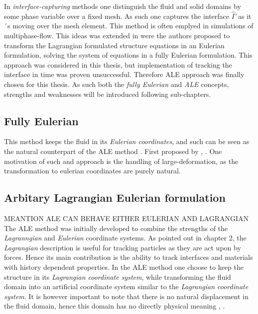 In \textit{interface-capturing} methods one distinguish the fluid and solid domains by some phase variable over a fixed mesh. As such one captures the interface  $\hat{\Gamma}$ as it´s moving over the mesh element. This method is often emplyed in simulations of multiphase-flow. This ideas was extended in \cite{Dunne2006a} were the authors proposed to transform the Lagrangian formulated structure equations in an Eulerian formulation, solving the system of equations in a fully Eulerian formulation. 
This approach was considered in this thesis, but implementation of tracking the interface in time was proven unsuccessful. Therefore ALE approach was finally chosen for this thesis. As such both the \textit{fully Eulerian} and \textit{ALE} concepts, strengths and weaknesses will be introduced following sub-chapters. \\

 
\subsection{Fully Eulerian}
This method keeps the fluid in its \textit{Eulerian coordinates}, and such can be seen as the natural counterpart of the ALE method \cite{Wick2013}. First proposed by , \cite{Dunne2006}. One motivation of such and approach is the handling of large-deformation, as the transformation to eulerian coordinates are purely natural.

\subsection{Arbitary Lagrangian Eulerian formulation}
MEANTION ALE CAN  BEHAVE EITHER EULERIAN AND LAGRANGIAN
The ALE method was initially developed to combine the strengths of the \textit{Lagranngian} and \textit{Eulerian} coordinate systems. As pointed out in chapter 2, the \textit{Lagrangian} description is useful for tracking particles as they are act upon by forces. Hence its main contribution is the ability to track interfaces and materials with history dependent properties.
In the ALE method one choose to keep the structure in its \textit{Lagrangian coordinate system}, while transforming the fluid domain into an artificial coordinate system similar to the \textit{Lagrangian coordinate system}. It is however important to note that there is no natural displacement in the fluid domain, hence this domain has no directly physical meaning \cite{Richter2010a}, \cite{Donea2004}. 
 
